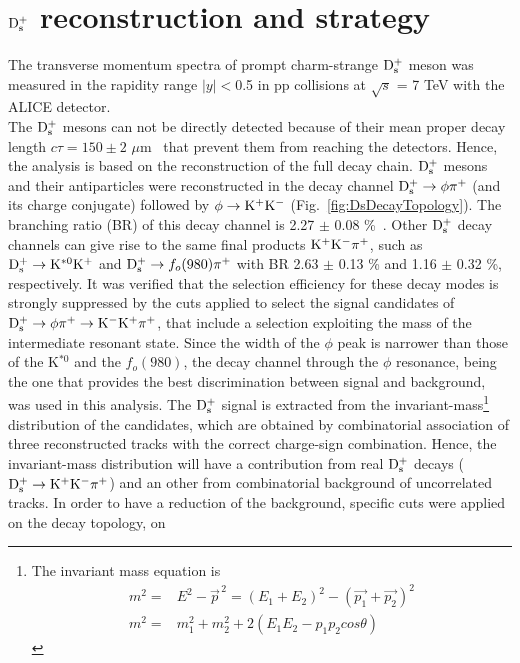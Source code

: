 \section{${\rm D_s^+}$ reconstruction and strategy}
\label{sec:DsRecoStrategy}
The transverse momentum spectra of prompt charm-strange ${\rm D_s^+}$ meson 
was measured in the rapidity range $|y| < $0.5 in pp collisions at 
$\sqrt{s}$ = 7 TeV with the ALICE detector.\\
The ${\rm D_s^+}$ mesons can not be directly detected because of 
their mean proper decay length $c\tau = 150\pm 2$ $ \mu$m~\cite{Olive:2016xmw} 
that prevent them from reaching the detectors. Hence, the analysis is 
based on the reconstruction of the full decay chain.
${\rm D_s^+}$ mesons and their antiparticles were 
 reconstructed in the decay channel ${\rm D_s^{+}\to \phi\pi^+}$ 
 (and its charge conjugate) followed by ${\phi \to {\rm K^+ K^-}}$ 
 (Fig.~\ref{fig:DsDecayTopology}). The branching ratio (BR) of this decay channel 
 is 2.27 $\pm$ 0.08 \%~\cite{Olive:2016xmw}.
Other ${\rm D_s^+}$ decay channels can give rise to the same final products
 ${\rm K^+ K^-}\pi^+$, such as ${\rm D_s^+}\rightarrow {\rm  K^{*0} K^+}$ and 
 ${\rm D_s^+}\rightarrow f_o(980) \pi^+$ with BR  2.63 $\pm$ 0.13 \% and 
 1.16 $\pm$ 0.32 \%, respectively. It was verified that the selection efficiency for 
 these decay modes is strongly suppressed by the cuts applied 
 to select the signal candidates of ${\rm D_s^{+}\to \phi\pi^+\to K^-K^+\pi^+}$, that include 
 a selection exploiting the mass of the intermediate resonant state. 
 Since the width of the $\phi$ peak is narrower than those of the 
 K$^{*0}$ and the $f_o(980)$, the decay channel through the 
 $\phi$ resonance, being the one that provides the best discrimination 
 between signal and background, was used in this analysis. 
 The ${\rm D_s^+}$ signal is extracted from 
 the invariant-mass\footnote{The invariant mass equation is \\ 
 \begin{align*} m^2 =& E^2 -\vec{p}^{\, 2} = (E_1 + E_2)^2 -(\vec{p_1} + \vec{p_2})^2 \\ m^2 =& m_1^2 +m_2^2 + 2(E_1E_2 -p_1p_2cos\theta) \end{align*}} 
 distribution of the candidates, which are obtained by 
 combinatorial association of three reconstructed tracks with the correct 
 charge-sign combination. Hence, 
 the invariant-mass distribution will have a contribution from real 
 ${\rm D_s^+}$ decays (${\rm D^{+}_\mathrm{s}\to K^+ K^-\pi^+}$) and an other 
 from combinatorial background of uncorrelated tracks. In order to have a reduction of the
  background, specific cuts were applied on the decay topology, on
